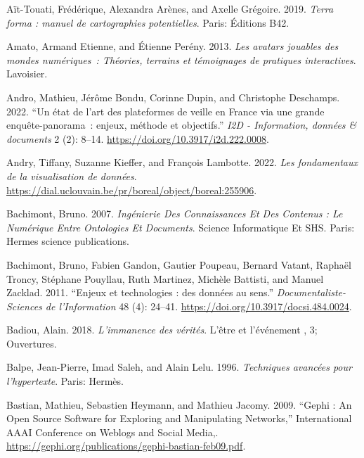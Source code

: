 \documentclass[
  letterpaper,
  DIV=11,
  numbers=noendperiod]{scrreprt}
\newlength{\cslhangindent}
\newlength{\cslentryspacingunit} %
\newenvironment{CSLReferences}[2] %
 {%
  \setlength{\parindent}{0pt}
  \ifodd #1
  \let\oldpar\par
  \def\par{\hangindent=\cslhangindent\oldpar}
  \fi
  \setlength{\parskip}{#2\cslentryspacingunit}
 }%
 {}
\begin{document}
\hypertarget{refs}{}
\begin{CSLReferences}{1}{0}
\leavevmode{}%
Aït-Touati, Frédérique, Alexandra Arènes, and Axelle Grégoire. 2019.
\emph{Terra forma : manuel de cartographies potentielles}. Paris:
Éditions B42.

\leavevmode{}%
Amato, Armand Etienne, and Étienne Perény. 2013. \emph{Les avatars
jouables des mondes numériques~: Théories, terrains et témoignages de
pratiques interactives}. Lavoisier.

\leavevmode{}%
Andro, Mathieu, Jérôme Bondu, Corinne Dupin, and Christophe Deschamps.
2022. {``Un état de l{'}art des plateformes de veille en France via une
grande enquête-panorama~: enjeux, méthode et objectifs.''} \emph{I2D -
Information, données \& documents} 2 (2): 8--14.
\url{https://doi.org/10.3917/i2d.222.0008}.

\leavevmode{}%
Andry, Tiffany, Suzanne Kieffer, and François Lambotte. 2022. \emph{Les
fondamentaux de la visualisation de données}.
\url{https://dial.uclouvain.be/pr/boreal/object/boreal:255906}.

\leavevmode{}%
Bachimont, Bruno. 2007. \emph{Ingénierie Des Connaissances Et Des
Contenus : Le Numérique Entre Ontologies Et Documents}. Science
Informatique Et SHS. Paris: Hermes science publications.

\leavevmode{}%
Bachimont, Bruno, Fabien Gandon, Gautier Poupeau, Bernard Vatant,
Raphaël Troncy, Stéphane Pouyllau, Ruth Martinez, Michèle Battisti, and
Manuel Zacklad. 2011. {``Enjeux et technologies : des données au
sens.''} \emph{Documentaliste-Sciences de l'Information} 48 (4): 24--41.
\url{https://doi.org/10.3917/docsi.484.0024}.

\leavevmode{}%
Badiou, Alain. 2018. \emph{L'immanence des vérités}. L'être et
l'événement , 3; Ouvertures.

\leavevmode{}%
Balpe, Jean-Pierre, Imad Saleh, and Alain Lelu. 1996. \emph{Techniques
avancées pour l'hypertexte}. Paris: Hermès.

\leavevmode{}%
Bastian, Mathieu, Sebastien Heymann, and Mathieu Jacomy. 2009. {``Gephi
: An Open Source Software for Exploring and Manipulating Networks,''}
International AAAI Conference on Weblogs and Social Media,.
\url{https://gephi.org/publications/gephi-bastian-feb09.pdf}.


\end{CSLReferences}
\end{document}
